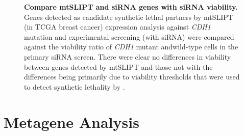 \begin{figure}[!htp]
\begin{center}
   \end{center}
   \caption[Compare \acrshort{mtSLIPT} and \gls{siRNA} genes with \gls{siRNA} viability]{\small \textbf{Compare \acrshort{mtSLIPT} and \gls{siRNA} genes with \gls{siRNA} viability.}  Genes detected as candidate synthetic lethal partners by \acrshort{mtSLIPT} (in \gls{TCGA} breast cancer) expression analysis against \textit{CDH1} mutation and experimental screening (with \gls{siRNA}) were compared against the viability ratio of \textit{CDH1} mutant and\gls{wild-type} cells in the primary \gls{siRNA} screen. There were clear no differences in viability between genes detected by \acrshort{mtSLIPT} and those not with the differences being primarily due to viability thresholds that were used to detect synthetic lethality by \citet{Telford2015}. 
}
\label{fig:compare_viability_mtSL}
\end{figure}


\clearpage
\chapter{Metagene Analysis}  \label{chapt3:metagene_results}

